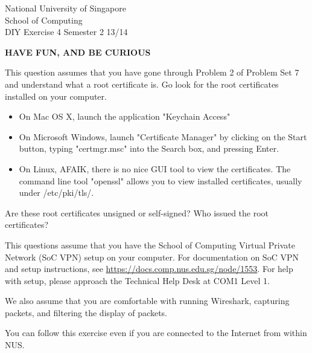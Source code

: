 \documentclass[a4paper,11pt]{exam}
\begin{document}
\extraheadheight{.5in}
%
{\large\sf National University of Singapore\\ School of Computing \\
\LARGE\sf DIY Exercise 4}%
{\large\sf Semester 2 13/14}
\firstpageheadrule
\pagestyle{headandfoot}

\begin{center}
	\textbf\textsf{HAVE FUN, AND BE CURIOUS}
\end{center}

\begin{questions}

\question This question assumes that you have gone through Problem 2 of Problem Set 7 and understand what a root certificate is.  Go look for the root certificates installed on your computer.  
\begin{itemize}
\item On Mac OS X, launch the application "Keychain Access"
\item On Microsoft Windows, launch "Certificate Manager" by clicking on the Start button, typing "certmgr.msc" into the Search box, and pressing Enter.
\item On Linux, AFAIK, there is no nice GUI tool to view the certificates.  The command line tool "openssl" allows you to view installed certificates, usually under /etc/pki/tls/.
\end{itemize}

Are these root certificates unsigned or self-signed?  Who issued the root certificates?

\question
This questions assume that you have the School of Computing Virtual Private Network (SoC VPN) setup on your computer.  For documentation on SoC VPN and setup instructions, see \url{https://docs.comp.nus.edu.sg/node/1553}.  For help with setup, please approach the Technical Help Desk at COM1 Level 1.

We also assume that you are comfortable with running Wireshark, capturing packets, and 
filtering the display of packets. 

You can follow this exercise even if you are connected to the Internet from within NUS.

\end{questions}
\end{document}
